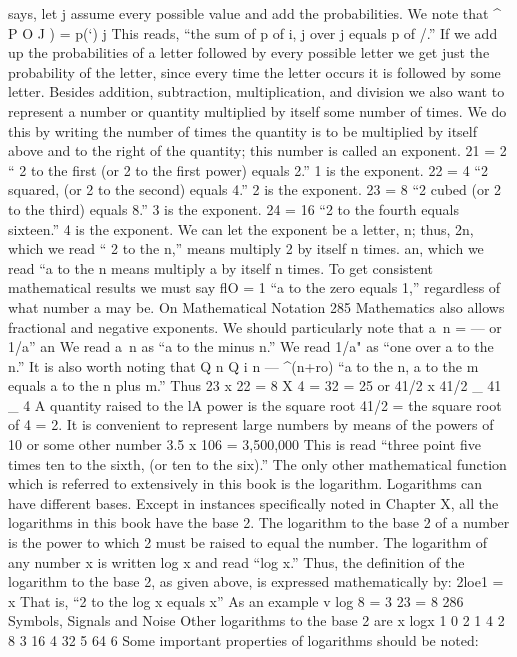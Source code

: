 {{{{{{{{{{{{{{{says, let j assume every possible value and add the probabilities.
We note that
^ P O J ) = p(‘)
j
This reads, “the sum of p of i, j over j equals p of /.” If we add up
the probabilities of a letter followed by every possible letter we get
just the probability of the letter, since every time the letter occurs
it is followed by some letter.
Besides addition, subtraction, multiplication, and division we
also want to represent a number or quantity multiplied by itself
some number of times. We do this by writing the number of times
the quantity is to be multiplied by itself above and to the right of
the quantity; this number is called an exponent.
21 = 2
“ 2 to the first (or 2 to the first power) equals 2.” 1 is the exponent.
22 = 4
“2 squared, (or 2 to the second) equals 4.” 2 is the exponent.
23 = 8
“2 cubed (or 2 to the third) equals 8.” 3 is the exponent.
24 = 16
“2 to the fourth equals sixteen.” 4 is the exponent.
We can let the exponent be a letter, n; thus, 2n, which we read
“ 2 to the n,” means multiply 2 by itself n times. an, which we read
“a to the n means multiply a by itself n times.
To get consistent mathematical results we must say
flO = 1
“a to the zero equals 1,” regardless of what number a may be.
On Mathematical Notation 285
Mathematics also allows fractional and negative exponents. We
should particularly note that
a~n = — or 1/a”
an
We read a~n as “a to the minus n.” We read 1/a" as “one over a
to the n.”
It is also worth noting that
Q n Q i n — ^(n+ro)
“a to the n, a to the m equals a to the n plus m.” Thus
23 x 22 = 8 X 4 = 32 = 25
or
41/2 x 41/2 _ 41 _ 4
A quantity raised to the lA power is the square root
41/2 = the square root of 4 = 2.
It is convenient to represent large numbers by means of the
powers of 10 or some other number
3.5 x 106 = 3,500,000
This is read “three point five times ten to the sixth, (or ten to
the six).”
The only other mathematical function which is referred to extensively
in this book is the logarithm. Logarithms can have different
bases. Except in instances specifically noted in Chapter X, all the
logarithms in this book have the base 2. The logarithm to the base 2
of a number is the power to which 2 must be raised to equal the
number. The logarithm of any number x is written log x and read
“log x.” Thus, the definition of the logarithm to the base 2, as given
above, is expressed mathematically by:
2loe1 = x
That is, “2 to the log x equals x”
As an example
v log 8 = 3
23 = 8
286 Symbols, Signals and Noise
Other logarithms to the base 2 are
x logx
1 0
2 1
4 2
8 3
16 4
32 5
64 6
Some important properties of logarithms should be noted:
}}}}}}}}}}}}}}}
